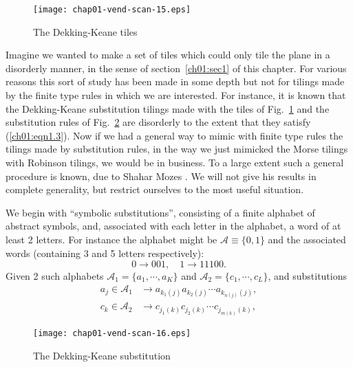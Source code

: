 \documentclass[reqno]{stml-l}
\theoremstyle{plain}
\theoremstyle{definition}
\numberwithin{equation}{chapter}
\begin{document}
\begin{figure}[!h]
\texttt{[image: chap01-vend-scan-15.eps]}
\caption{The Dekking-Keane tiles}\label{ch01:fig28}
\end{figure}

Imagine we wanted to make a set of tiles which could only tile the plane in a disorderly manner, in the sense of section~\ref{ch01:sec1} of this chapter. For various reasons this sort of study has been made in some depth but not for tilings made by the finite type rules in which we are interested. For instance, it is known \cite{bib:DeK} that the Dekking-Keane substitution tilings made with the tiles of Fig.~\ref{ch01:fig28} and the substitution rules of Fig.~\ref{ch01:fig29} are disorderly to the extent that they satisfy (\ref{ch01:eqn1.3}). Now if we had a general way to mimic with finite type rules the tilings made by substitution rules, in the way we just mimicked the Morse tilings with Robinson tilings, we would be in business. To a large extent such a general procedure is known, due to Shahar Mozes \cite{bib:Moz}. We will not give his results in complete generality, but restrict ourselves to the most useful situation.

We begin with ``symbolic substitutions'', consisting of a finite alphabet of abstract symbols, and, associated with each letter in the alphabet, a word of at least 2 letters. For instance the alphabet might be $\mathcal{A}\equiv\{0,1\}$ and the associated words (containing 3 and 5 letters respectively):
\begin{equation}\label{ch01:eqn1.20}
0\xrightarrow{\quad} 001,\quad 1 \xrightarrow{\quad} 11100.
\end{equation}
Given 2 such alphabets $\mathcal{A}_{1}=\{a_{1}, \cdots, a_{K}\}$ and $\mathcal{A}_{2}=\{c_{1}, \cdots, c_{L}\}$, and substitutions
\begin{equation}\label{ch01:eqn1.21}
\begin{split}
a_{j}\in \mathcal{A}_{1} & \longrightarrow a_{k_{1}(j)}a_{k_{2}(j)}\cdots a_{k_{n(j)}(j)},\\
c_{k}\in \mathcal{A}_{2}&\longrightarrow c_{j_{1}(k)}c_{j_{2}(k)}\cdots c_{j_{m(k)}(k)},
\end{split}
\end{equation}

\begin{figure}[!h]
\texttt{[image: chap01-vend-scan-16.eps]}
\caption{The Dekking-Keane substitution }\label{ch01:fig29}
\end{figure}
\end{document}
